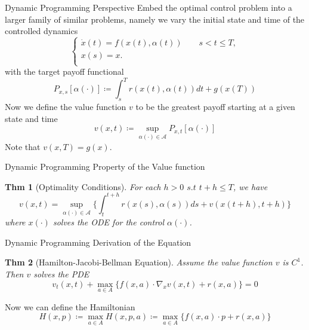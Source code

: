 \documentclass[english]{pkuslide}
\newtheorem{Thm}{Thm}
\begin{document}
\begin{frame}{Dynamic Programming} {Perspective}
Embed the optimal control problem into a larger family of similar problems, namely we vary the initial state and time of the controlled dynamics
\begin{equation}
  \left\{
   \begin{array}{l}
   \dot{x}(t) = f(x(t), \alpha(t)) \qquad s<t \leq T,  \\
   x(s) = x.  \\
   \end{array}
  \right.
\end{equation} 
with the target payoff functional
\begin{equation}
P_{x,s}[\alpha(\cdot)] \coloneqq \int_{s}^{T} r(x(t), \alpha(t))dt +g(x(T))
\end{equation}
Now we define the value function $v$ to be the greatest payoff starting at a given state and time
\begin{equation}
v(x,t)  \coloneqq \sup_{\alpha(\cdot) \in \mathcal{A}}{P_{x,t}[\alpha(\cdot)]}
\end{equation}
Note that $v(x,T)=g(x)$.
\end{frame}
\begin{frame}{Dynamic Programming} {Property of the Value function}
\begin{Thm}[Optimality Conditions]
For each $h>0$ $s.t$ $t+h\leq T$, we have
\begin{equation}
v(x, t)=\sup_{\alpha(\cdot) \in \mathcal{A}}{ \{ \int_{t}^{t+h}r(x(s), \alpha(s))ds +v(x(t+h), t+h)\}} 
\end{equation} 
where $x(\cdot)$ solves the ODE for the control $\alpha(\cdot)$.
\end{Thm}
\end{frame}
\begin{frame}{Dynamic Programming} {Derivation of the Equation}
\begin{Thm}[Hamilton-Jacobi-Bellman Equation]
Assume the value function $v$ is $C^1$. Then $v$ solves the PDE
\begin{equation}
v_{t}(x, t)+\max_{a \in A}{ \{ f(x, a)\cdot \nabla_{x}{v(x,t)} +r(x,a) \}} =0
\end{equation} 

\end{Thm}
Now we can define the Hamiltonian 
\begin{equation}
H(x,p) \coloneqq  \max_{a \in A}H(x,p,a) \coloneqq \max_{a \in A}{\{ f(x,a)\cdot p +r(x,a) \} }
\end{equation}
\end{frame}
\end{document}

